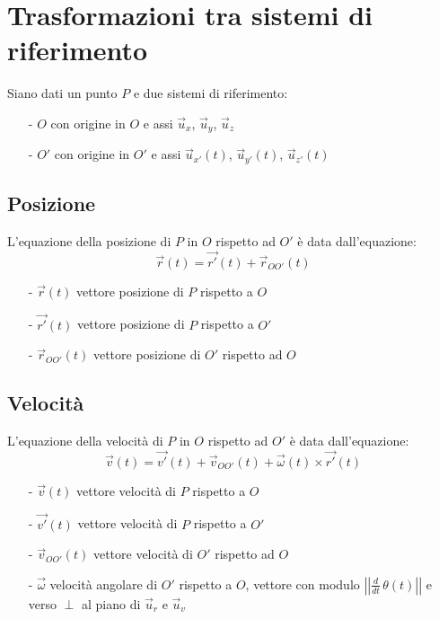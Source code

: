 \documentclass[a4paper]{article}
\newcommand\ux{\vec{u}_x}
\newcommand\uy{\vec{u}_y}
\newcommand\uz{\vec{u}_z}
\newcommand\uxp{\vec{u}_{x'}}
\newcommand\uyp{\vec{u}_{y'}}
\newcommand\uzp{\vec{u}_{z'}}
\newcommand\ur{\vec{u}_r}
\newcommand\uv{\vec{u}_v}
\newcommand\dt{\frac{d}{dt}\,}
\newcommand\vmod[1]{\left|\left|{#1}\right|\right|}
\begin{document}
\newpage

\section{Trasformazioni tra sistemi di riferimento}
Siano dati un punto \(P\) e due sistemi di riferimento:
\begin{itemize}[topsep=3pt, itemsep=0pt]
	\item[-] \(O\) con origine in \(O\) e assi \(\ux\), \(\uy\), \(\uz\)
	\item[-] \(O'\) con origine in \(O'\) e assi \(\uxp(t)\), \(\uyp(t)\), \(\uzp(t)\)
\end{itemize}

\subsection{Posizione}
L'equazione della posizione di \(P\) in \(O\) rispetto ad \(O'\) è data dall'equazione:
\[\vec{r}(t) = \vec{r'}(t) + \vec{r}_{OO'}(t)\]
\begin{itemize}[topsep=3pt, itemsep=0pt]
	\item[-] \(\vec{r}(t)\) vettore posizione di \(P\) rispetto a \(O\)
	\item[-] \(\vec{r'}(t)\) vettore posizione di \(P\) rispetto a \(O'\)
	\item[-] \(\vec{r}_{OO'}(t)\) vettore posizione di \(O'\) rispetto ad \(O\)
\end{itemize}

\subsection{Velocità}
L'equazione della velocità di \(P\) in \(O\) rispetto ad \(O'\) è data dall'equazione:
\[\vec{v}(t) = \vec{v'}(t) + \vec{v}_{OO'}(t) + \vec{\omega}(t) \times \vec{r'}(t)\]
\begin{itemize}[topsep=3pt, itemsep=0pt]
	\item[-] \(\vec{v}(t)\) vettore velocità di \(P\) rispetto a \(O\)
	\item[-] \(\vec{v'}(t)\) vettore velocità di \(P\) rispetto a \(O'\)
	\item[-] \(\vec{v}_{OO'}(t)\) vettore velocità di \(O'\) rispetto ad \(O\)
	\item[-] \(\vec{\omega}\) velocità angolare di \(O'\) rispetto a \(O\), vettore con modulo \(\vmod{\dt \theta(t)}\) e verso \(\perp\) al piano di \(\ur\) e \(\uv\)
\end{itemize}
\end{document}
